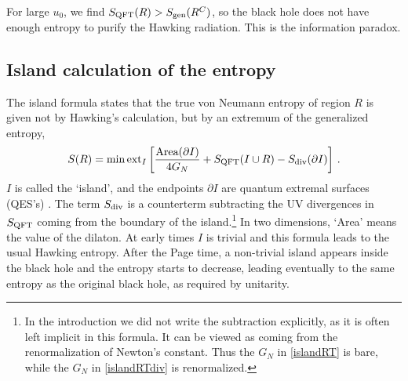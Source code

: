 \documentclass[12pt]{article}
\newcommand{\p}{\partial}
\newcommand{\f}{\frac}
\let\l=\lambda \let\m=\mu \let\n=\nu \let\x=\xi \let\p=\phi \let\r=v
\let\f=\frac
\def\ba{\begin{eqnarray}}
\def\ea{\end{eqnarray}}
\renewcommand{\p}{\partial}
\numberwithin{equation}{section}
\def\m{{\mu}}
\def\n{{\nu}}
\def\p{{\phi}}
\def\pp{\partial}
\def\ba{\begin{eqnarray}}
\def\ea{\end{eqnarray}}
\def\r{\rightarrow}
\def\f {\frac}
\def\l{\left}
\def\r{\right}
\def\x{\bar{x}}
\renewcommand{\p}{\partial}
\newcommand{\Smatter}{S_{\rm QFT}}
\begin{document}
\begin{spacing}{1.1}
For large $u_0$, we find $\Smatter(R) > S_{\rm gen}(R^C)$, so the black hole does not have enough entropy to purify the Hawking radiation. This is the information paradox.





\subsection{Island calculation of the entropy}
The island formula \cite{Penington:2019npb,Almheiri:2019psf,Almheiri:2019hni,Almheiri:2020cfm,Penington:2019kki} states that the true von Neumann entropy of region $R$ is given not by Hawking's calculation, but by an extremum of the generalized entropy,
  \ba\label{islandRTdiv}
 S(R)={\rm min}\, {\rm ext}_{I}\l[
 \f{\mbox{Area}(\pp{I})}{4G_N}+S_{\rm QFT}(I\cup R) - S_{\rm div}(\p I) 
 \r]\, .
 \ea
$I$ is called the `island', and the endpoints $ \p I$ are quantum extremal surfaces (QES's) \cite{Engelhardt:2014gca}.  The term $S_{\rm div}$ is a counterterm subtracting the UV divergences in $\Smatter$ coming from the boundary of the island.\footnote{In the introduction we did not write the subtraction explicitly, as it is often left implicit in this formula. It can be viewed as coming from the renormalization of Newton's constant. Thus the $G_N$ in \eqref{islandRT} is bare, while the $G_N$ in \eqref{islandRTdiv} is renormalized.}  In two dimensions, `Area' means the value of the dilaton. At early times $I$ is trivial and this formula leads to the usual Hawking entropy. After the Page time, a non-trivial island appears inside the black hole and the entropy starts to decrease, leading eventually to the same entropy as the original black hole, as required by unitarity.


\end{spacing}
\end{document}
